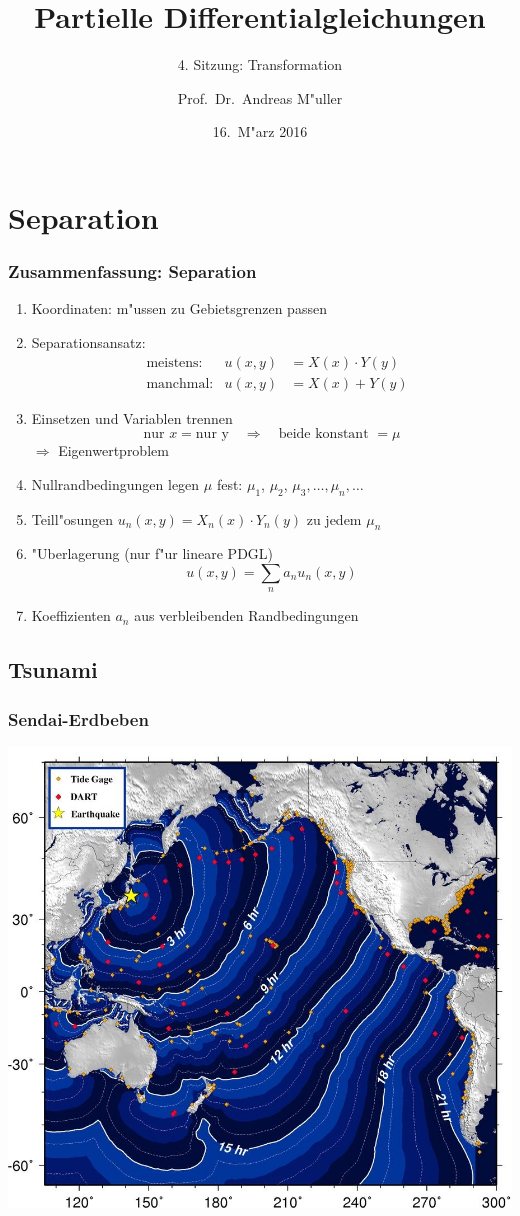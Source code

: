 \documentclass[handout]{beamer}
\title[]{Partielle Differentialgleichungen}
\subtitle{4. Sitzung: Transformation}
\date[16.~M"arz 2016]{16.~M"arz 2016}
\author{Prof.~Dr.~Andreas M"uller}
\begin{document}
\section{Separation}

\begin{frame}
\titlepage

\end{frame}

\begin{frame}
\frametitle{Zusammenfassung: Separation}
\begin{enumerate}
\item Koordinaten: m"ussen zu Gebietsgrenzen passen
\item Separationsansatz: 
\begin{align*}
&\text{meistens:}&u(x,y)&=X(x)\cdot Y(y)\\
&\text{manchmal:}&u(x,y)&=X(x)+Y(y)
\end{align*}
\item Einsetzen und Variablen trennen
\[
\text{nur $x$} = \text{nur y}\quad\Rightarrow\quad \text{beide konstant $=\mu$}
\]
$\Rightarrow$ Eigenwertproblem
\item Nullrandbedingungen legen $\mu$ fest: $\mu_1$, $\mu_2$,
$\mu_3,\dots,\mu_n,\dots$
\item Teill"osungen $u_n(x,y)=X_n(x)\cdot Y_n(y)$  zu jedem $\mu_n$
\item "Uberlagerung (nur f"ur lineare PDGL)
\[
u(x,y)=\sum_n a_nu_n(x,y)
\]
\item Koeffizienten $a_n$ aus verbleibenden Randbedingungen
\end{enumerate}
\end{frame}

\begin{frame}
\section{Tsunami}
\frametitle{Sendai-Erdbeben}
\begin{center}
\includegraphics[width=0.85\hsize]{../../skript/graphics/sendainoaa.jpg}
\end{center}
\end{frame}
\end{document}

